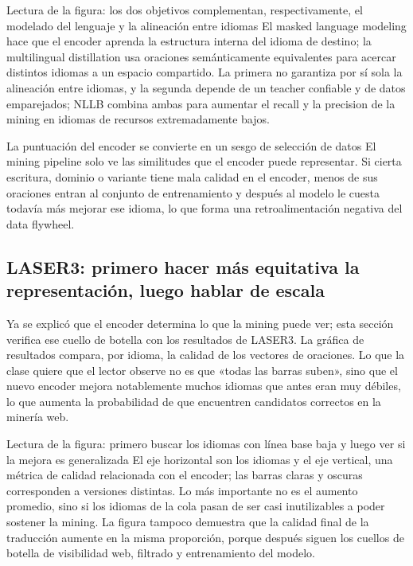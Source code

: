 
\begin{knowledgebox}{Lectura de la figura: los dos objetivos complementan, respectivamente, el modelado del lenguaje y la alineación entre idiomas}
El masked language modeling hace que el encoder aprenda la estructura interna del idioma de destino; la multilingual distillation usa oraciones semánticamente equivalentes para acercar distintos idiomas a un espacio compartido. La primera no garantiza por sí sola la alineación entre idiomas, y la segunda depende de un teacher confiable y de datos emparejados; NLLB combina ambas para aumentar el recall y la precision de la mining en idiomas de recursos extremadamente bajos.
\end{knowledgebox}

\begin{warningbox}{La puntuación del encoder se convierte en un sesgo de selección de datos}
El mining pipeline solo ve las similitudes que el encoder puede representar. Si cierta escritura, dominio o variante tiene mala calidad en el encoder, menos de sus oraciones entran al conjunto de entrenamiento y después al modelo le cuesta todavía más mejorar ese idioma, lo que forma una retroalimentación negativa del data flywheel.
\end{warningbox}

\subsection{LASER3: primero hacer más equitativa la representación, luego hablar de escala}

Ya se explicó que el encoder determina lo que la mining puede ver; esta sección verifica ese cuello de botella con los resultados de LASER3. La gráfica de resultados compara, por idioma, la calidad de los vectores de oraciones. Lo que la clase quiere que el lector observe no es que «todas las barras suben», sino que el nuevo encoder mejora notablemente muchos idiomas que antes eran muy débiles, lo que aumenta la probabilidad de que encuentren candidatos correctos en la minería web.


\begin{knowledgebox}{Lectura de la figura: primero buscar los idiomas con línea base baja y luego ver si la mejora es generalizada}
El eje horizontal son los idiomas y el eje vertical, una métrica de calidad relacionada con el encoder; las barras claras y oscuras corresponden a versiones distintas. Lo más importante no es el aumento promedio, sino si los idiomas de la cola pasan de ser casi inutilizables a poder sostener la mining. La figura tampoco demuestra que la calidad final de la traducción aumente en la misma proporción, porque después siguen los cuellos de botella de visibilidad web, filtrado y entrenamiento del modelo.
\end{knowledgebox}

